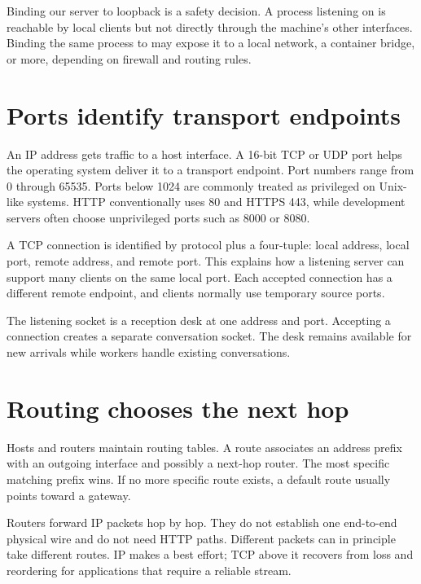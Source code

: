 Binding our server to loopback is a safety decision. A process listening on
 is reachable by local clients but not directly through the
machine's other interfaces. Binding the same process to 
may expose it to a local network, a container bridge, or more, depending on
firewall and routing rules.

\section{Ports identify transport endpoints}

An IP address gets traffic to a host interface. A 16-bit TCP or UDP port helps
the operating system deliver it to a transport endpoint. Port numbers range
from 0 through 65535. Ports below 1024 are commonly treated as privileged on
Unix-like systems. HTTP conventionally uses 80 and HTTPS 443, while development
servers often choose unprivileged ports such as 8000 or 8080.

A TCP connection is identified by protocol plus a four-tuple: local address,
local port, remote address, and remote port. This explains how a listening
server can support many clients on the same local port. Each accepted connection
has a different remote endpoint, and clients normally use temporary source ports.

\begin{mentalmodel}
The listening socket is a reception desk at one address and port. Accepting a
connection creates a separate conversation socket. The desk remains available
for new arrivals while workers handle existing conversations.
\end{mentalmodel}

\section{Routing chooses the next hop}

Hosts and routers maintain routing tables. A route associates an address prefix
with an outgoing interface and possibly a next-hop router. The most specific
matching prefix wins. If no more specific route exists, a default route usually
points toward a gateway.

Routers forward IP packets hop by hop. They do not establish one end-to-end
physical wire and do not need HTTP paths. Different packets can in principle
take different routes. IP makes a best effort; TCP above it recovers from loss
and reordering for applications that require a reliable stream.

